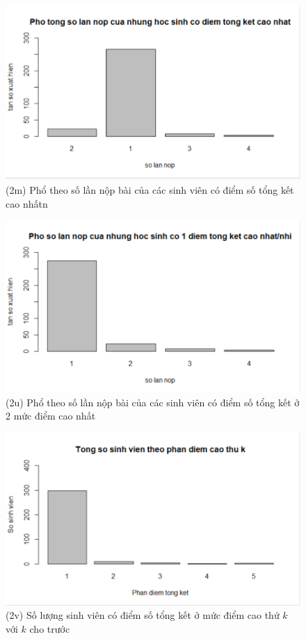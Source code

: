 \documentclass[a4paper]{article}
\theoremstyle{definition}
\begin{document}
\begin{figure}[!ht]
    \centering
    \includegraphics[scale=0.4]{Pics/q2m-file4.PNG}
    \caption{(2m) Phổ theo số lần nộp bài của các sinh viên có điểm số tổng kết cao nhấtn}
    \label{fig:my_label}
\end{figure}
\begin{figure}[!ht]
    \centering
    \includegraphics[scale=0.4]{Pics/q2u-file4.PNG}
    \caption{(2u) Phổ theo số lần nộp bài của các sinh viên có điểm số tổng kết ở 2 mức điểm cao nhất}
    \label{fig:my_label}
\end{figure}
\newpage 
\begin{figure}[!ht]
    \centering
    \includegraphics[scale=0.4]{Pics/q2v-file4.PNG}
    \caption{(2v) Số lượng sinh viên có điểm số tổng kết ở mức điểm cao thứ $k$ với $k$ cho trước}
    \label{fig:my_label}
\end{figure}
\end{document}
